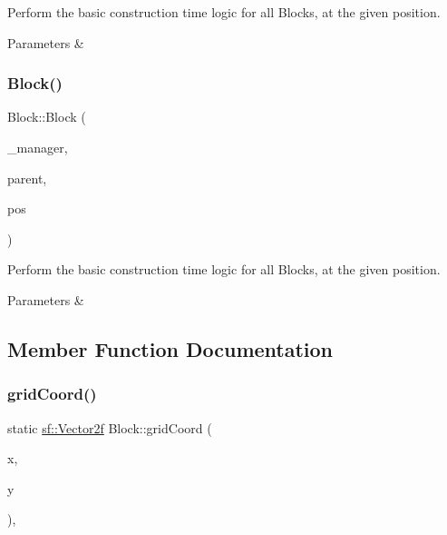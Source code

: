 Perform the basic construction time logic for all Blocks, at the given position. 


\begin{DoxyParams}{Parameters}
{\em } & \\
\hline
\end{DoxyParams}
\mbox{\label{class_block_abee0f2138d09318e3fc619e3e288d5f7}} 
\subsubsection{\texorpdfstring{Block()}{Block()}\hspace{0.1cm}{\footnotesize\ttfamily [3/3]}}
{\footnotesize\ttfamily Block\+::\+Block (\begin{DoxyParamCaption}\item[{\mbox{\hyperlink{class_game_manager}{Game\+Manager}} $\ast$}]{\+\_\+manager,  }\item[{\mbox{\hyperlink{class_game_entity}{Game\+Entity}} $\ast$}]{parent,  }\item[{\mbox{\hyperlink{classsf_1_1_vector2}{sf\+::\+Vector2f}}}]{pos }\end{DoxyParamCaption})\hspace{0.3cm}{\ttfamily [protected]}}



Perform the basic construction time logic for all Blocks, at the given position. 


\begin{DoxyParams}{Parameters}
{\em } & \\
\hline
\end{DoxyParams}


\subsection{Member Function Documentation}
\mbox{\label{class_block_ab69c893e453e6fadaf5d50919f07e83f}} 
\subsubsection{\texorpdfstring{gridCoord()}{gridCoord()}}
{\footnotesize\ttfamily static \mbox{\hyperlink{classsf_1_1_vector2}{sf\+::\+Vector2f}} Block\+::grid\+Coord (\begin{DoxyParamCaption}\item[{float}]{x,  }\item[{float}]{y }\end{DoxyParamCaption})\hspace{0.3cm}{\ttfamily [inline]}, {\ttfamily [static]}}




